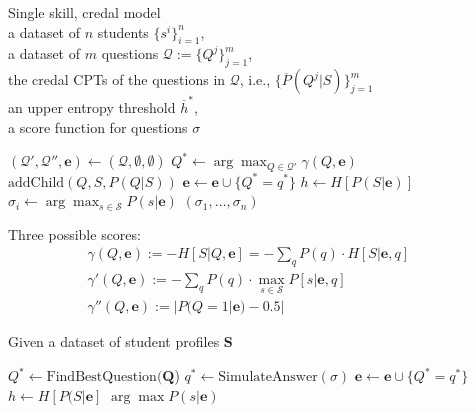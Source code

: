 \documentclass[runningheads]{llncs}
\begin{document}
	
	\begin{algorithm}[htp!]
		\caption{Single skill, credal model\\a dataset of $n$ students $\{s^i\}_{i=1}^n$,\\a 
		dataset of $m$ questions $\mathcal{Q}:=\{Q^j\}_{j=1}^m$,\\
			the credal CPTs of the questions in $\mathcal{Q}$, i.e., 
			$\{\overline{P}(Q^j|S)\}_{j=1}^m$\\
			an upper entropy threshold $\overline{h}^*$,\\
			a score function for questions $\sigma$
			\label{alg:simple2}}
		\begin{algorithmic}[1]
			\STATE $(\mathcal{Q}',\mathcal{Q}'',\bm{e}) \gets 
			(\mathcal{Q},\emptyset,\emptyset)$
			\STATE $Q^* \gets \arg\max_{Q \in \mathcal{Q}'}\gamma(Q,\bm{e})$
			\STATE $\mathrm{addChild}(Q,S,P(Q|S))$
			\STATE $\bm{e} \gets \bm{e} \cup \{ Q^*=q^* \}$
			\STATE $h \gets H[P(S|\bm{e})]$
			\ENDWHILE
			\STATE $\sigma_i \gets \arg\max_{s\in\mathcal{S}} P(s|\bm{e})$
			\ENDFOR
			 $(\sigma_1,\ldots,\sigma_n)$
		\end{algorithmic}
	\end{algorithm}
	Three possible scores:
	\begin{eqnarray}
		\gamma(Q,\bm{e}) := -H[S|Q,\bm{e}] = -\sum_q P(q) \cdot H[S|\bm{e},q]&&\\
		\gamma'(Q,\bm{e}) :=  -\sum_q P(q) \cdot \max_{s\in\mathcal{S}}  P[s|\bm{e},q]&&\\
		\gamma''(Q,\bm{e}) :=  |P(Q=1|\bm{e})-0.5|&&
	\end{eqnarray}
	
	
	
	
	\begin{algorithm}[htp!]
		\caption{Given a dataset of student profiles $\bm{S}$\label{alg:simple3}}
		\begin{algorithmic}[1]
			\STATE $Q^* \gets \mathrm{FindBestQuestion}(\bm{Q}$)
			\STATE $q^* \gets \mathrm{SimulateAnswer}(\sigma)$
			\STATE $\bm{e} \gets \bm{e} \cup \{ Q^*=q^* \}$
			\STATE $h \gets H[P(S|\bm{e}]$
			\ENDWHILE
			\ENDFOR
			 $\arg\max P(s|\bm{e})$
		\end{algorithmic}
	\end{algorithm}
	
\end{document}
